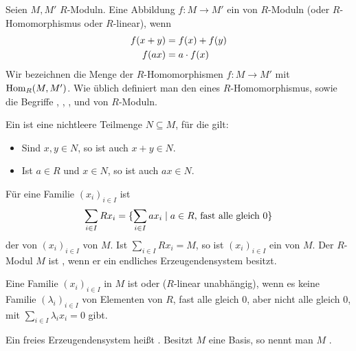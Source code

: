 \begin{definition}
	Seien $M,M'$ $R$-Moduln. Eine Abbildung $f:M\to M'$ ein  von $R$-Moduln (oder $R$-Homomorphismus oder $R$-linear), wenn
	\begin{align}
		f(x+y)&=f(x)+f(y) \notag \\
		f(ax) &= a\cdot f(x)\notag
	\end{align}
	Wir bezeichnen die Menge der $R$-Homomorphismen $f:M\to M'$ mit $\operatorname{Hom}_R(M,M')$. Wie üblich definiert man den  eines $R$-Homomorphismus, sowie die Begriffe , , ,  und  von $R$-Moduln.
\end{definition}

\begin{definition}
	Ein  ist eine nichtleere Teilmenge $N\subseteq M$, für die gilt:
	\begin{itemize}
		\item Sind $x,y\in N$, so ist auch $x+y\in N$.
		\item Ist $a\in R$ und $x\in N$, so ist auch $ax\in N$.
	\end{itemize}

	Für eine Familie $(x_i)_{i\in I}$ ist
	\begin{align}
		\sum_{i\in I} Rx_i=\{\sum_{i\in I} ax_i\mid a\in R\text{, fast alle gleich 0}\}\notag
	\end{align}
	der von $(x_i)_{i\in I}$  von $M$. Ist $\sum_{i\in I} Rx_i=M$, so ist $(x_i)_{i\in I}$ ein  von $M$. Der $R$-Modul $M$ ist , wenn er ein endliches Erzeugendensystem besitzt.
\end{definition}

\begin{definition}
	Eine Familie $(x_i)_{i\in I}$ in $M$ ist  oder ($R$-linear unabhängig), wenn es keine Familie $(\lambda_i)_{i\in I}$ von Elementen von $R$, fast alle gleich 0, aber nicht alle gleich 0, mit $\sum_{i\in I} \lambda_ix_i=0$ gibt.
	
	Ein freies Erzeugendensystem heißt . Besitzt $M$ eine Basis, so nennt man $M$ .
\end{definition}

